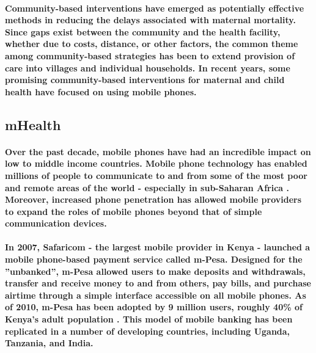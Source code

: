 \paragraph{Community-based interventions have emerged as potentially effective methods in reducing the delays associated with maternal mortality. Since gaps exist between the community and the health facility, whether due to costs, distance, or other factors, the common theme among community-based strategies has been to extend provision of care into villages and individual households. In recent years, some promising community-based interventions for maternal and child health have focused on using mobile phones.}

\subsection{mHealth}
\paragraph{Over the past decade, mobile phones have had an incredible impact on low to middle income countries. Mobile phone technology has enabled millions of people to communicate to and from some of the most poor and remote areas of the world - especially in sub-Saharan Africa \citep{Adler2007}. Moreover, increased phone penetration has allowed mobile providers to expand the roles of mobile phones  beyond that of simple communication devices.}

\paragraph{In 2007, Safaricom - the largest mobile provider in Kenya - launched a mobile phone-based payment service called m-Pesa. Designed for the ''unbanked'', m-Pesa allowed users to make deposits and withdrawals, transfer and receive money to and from others, pay bills, and purchase airtime through a simple interface accessible on all mobile phones. As of 2010, m-Pesa has been adopted by 9 million users, roughly 40\% of Kenya's adult population \citep{Mas2010}. This model of mobile banking has been replicated in a number of developing countries, including Uganda, Tanzania, and India.}
 
